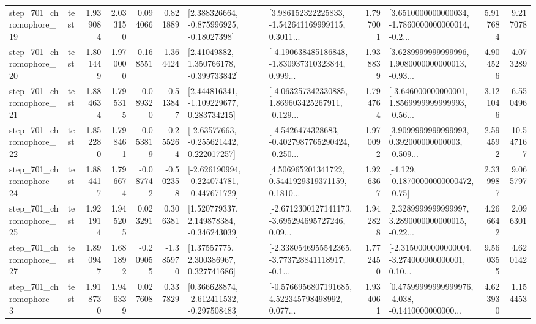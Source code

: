 \begin{tabular}{llrrrrllrlrr}
  step\_701\_chromophore\_19 &      test &      1.939084 &    2.033150 &      0.094066 &  0.821889 &    [2.388326664, -0.875996925, -0.18027398] &  [3.986152322225833, -1.542641169999115, 0.3011... &       1.797001 &  [3.6510000000000034, -1.7860000000000014, -0.2... &            5.917684 &          9.217078 \\
  step\_701\_chromophore\_20 &      test &      1.801449 &    1.970000 &      0.168551 &  1.364424 &     [2.41049882, 1.350766178, -0.399733842] &  [-4.190638485186848, -1.830937310323844, 0.999... &       1.938839 &  [3.6289999999999996, 1.9080000000000013, -0.93... &            4.904526 &          4.073289 \\
  step\_701\_chromophore\_21 &      test &      1.884634 &    1.795315 &     -0.089320 & -0.513847 &    [2.444816341, -1.109229677, 0.283734215] &  [-4.063257342330885, 1.869603425267911, -0.129... &       1.794764 &  [-3.646000000000001, 1.8569999999999993, -0.56... &            3.121046 &          6.550496 \\
  step\_701\_chromophore\_22 &      test &      1.852280 &    1.798461 &     -0.053819 & -0.255264 &    [-2.63577663, -0.255621442, 0.222017257] &  [-4.5426474328683, -0.4027987765290424, -0.250... &       1.970092 &  [3.9099999999999993, 0.392000000000003, -0.509... &            2.594592 &         10.547167 \\
  step\_701\_chromophore\_24 &      test &      1.884417 &    1.796674 &     -0.087742 & -0.502358 &  [-2.626190994, -0.224074781, -0.447671729] &  [4.506965201341722, 0.5441929319371159, 0.1810... &       1.926367 &              [-4.129, -0.18700000000000472, -0.75] &            2.339987 &          9.065797 \\
  step\_701\_chromophore\_25 &      test &      1.921914 &    1.945205 &      0.023291 &  0.306381 &    [1.520779337, 2.149878384, -0.346243039] &  [-2.6712300127141173, -3.695294695727246, 0.09... &       1.942828 &  [2.3289999999999997, 3.2890000000000015, -0.22... &            4.266642 &          2.096301 \\
  step\_701\_chromophore\_27 &      test &      1.890947 &    1.681892 &     -0.209055 & -1.385970 &      [1.37557775, 2.300386967, 0.327741686] &  [-2.3380546955542365, -3.773728841118917, -0.1... &       1.772450 &  [-2.3150000000000004, -3.274000000000001, 0.10... &            9.560355 &          4.620142 \\
   step\_701\_chromophore\_3 &      test &      1.918730 &    1.946339 &      0.027608 &  0.337829 &   [0.366628874, -2.612411532, -0.297508483] &  [-0.5766956807191685, 4.522345798498992, 0.077... &       1.934061 &  [0.47599999999999976, -4.038, -0.1410000000000... &            4.623930 &          1.154453 \\

\end{tabular}
